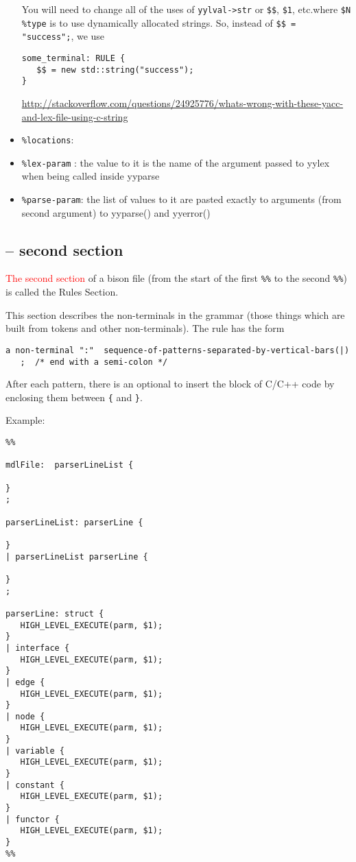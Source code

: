 \begin{itemize}
You will need to change all of the uses of \verb!yylval->str! or \verb!$$!,
\verb!$1!, etc.where \verb!$N %type! is to use dynamically allocated strings.
So, instead of \verb!$$ = "success";!, we use
\begin{verbatim}
some_terminal: RULE {
   $$ = new std::string("success");
}
\end{verbatim}  
\url{http://stackoverflow.com/questions/24925776/whats-wrong-with-these-yacc-and-lex-file-using-c-string}

   \item \verb!%locations!: 
   
   
   \item \verb!%lex-param! : the value to it is the name of the argument passed to yylex when being called inside yyparse
   
   
   \item \verb!%parse-param!: the list of values to it are pasted exactly to
   arguments (from second argument) to yyparse() and yyerror()
   
\end{itemize}

\subsection{-- second section}
\label{sec:bison-grammar-file-second-section}

\textcolor{red}{The second section} of a bison file (from the start of
the first \verb!%%! to the second \verb!%%!) is called the Rules Section.

This section describes the non-terminals in the grammar (those things which are
built from tokens and other non-terminals). The rule has the form 

{\tiny
\begin{verbatim}
a non-terminal ":"  sequence-of-patterns-separated-by-vertical-bars(|) 
   ;  /* end with a semi-colon */
\end{verbatim}
}

After each pattern, there is an optional to insert the block of C/C++ code by
enclosing them between \verb!{! and \verb!}!.

Example:
\begin{verbatim}
%%

mdlFile:  parserLineList {

}
;

parserLineList: parserLine {

}
| parserLineList parserLine {

}
;

parserLine: struct {
   HIGH_LEVEL_EXECUTE(parm, $1);
}
| interface {
   HIGH_LEVEL_EXECUTE(parm, $1);
}
| edge {
   HIGH_LEVEL_EXECUTE(parm, $1);
}
| node {
   HIGH_LEVEL_EXECUTE(parm, $1);
}
| variable {
   HIGH_LEVEL_EXECUTE(parm, $1);
}
| constant {
   HIGH_LEVEL_EXECUTE(parm, $1);
}
| functor {
   HIGH_LEVEL_EXECUTE(parm, $1);
}
%%
\end{verbatim}
  
